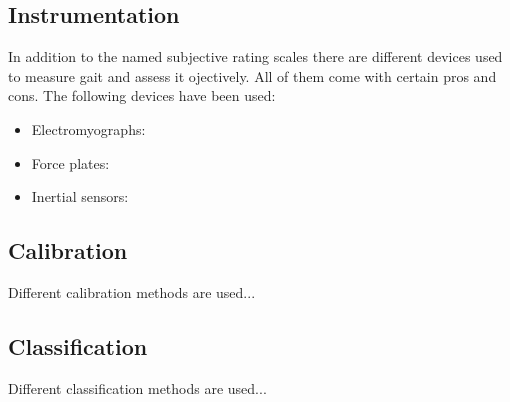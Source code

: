\subsection{Instrumentation}

In addition to the named subjective rating scales there are different devices used to measure gait and assess it ojectively. All of them come with certain pros and cons. The following devices have been used:

\begin{itemize}

\item Electromyographs:

\item Force plates:

\item Inertial sensors:

\end{itemize}

\subsection{Calibration}

Different calibration methods are used...


\subsection{Classification}

Different classification methods are used...

